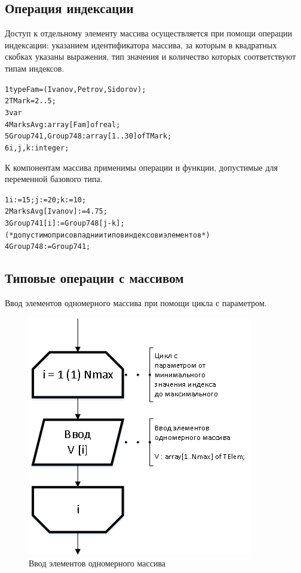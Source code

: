 \documentclass{beamer}
\begin{document}
\subsection{Операция индексации}
\begin{frame}[fragile]
Доступ к отдельному элементу массива осуществляется при помощи операции индексации: указанием идентификатора массива, за которым в квадратных скобках указаны выражения, тип значения и количество которых соответствуют типам индексов.
\begin{alltt}
1 type Fam = (Ivanov, Petrov, Sidorov);
2   TMark = 2..5; 
3 var 
4   MarksAvg: array[Fam] of real;
5   Group741, Group748: array[1..30] of TMark;
6   i, j, k: integer;
\end{alltt}
К компонентам массива применимы операции и функции, допустимые для переменной базового типа. 
\begin{alltt}
1 i := 15; j := 20; k := 10;
2 MarksAvg[ Ivanov ] := 4.75;
3 Group741[i] := Group748[j - k];
(* допустимо при совпаднии типов индексов и элементов *)
4 Group748 := Group741; 
\end{alltt}
\end{frame}

\subsection{Типовые операции с массивом}
\begin{frame}
Ввод элементов одномерного массива при помощи цикла с параметром.
\begin{figure}[h]
\centering
\includegraphics[scale=0.5]{images/array_input.png}
\caption{Ввод элементов одномерного массива}
\label{pic-input-one-index}
\end{figure}
\end{frame}
\end{document}

